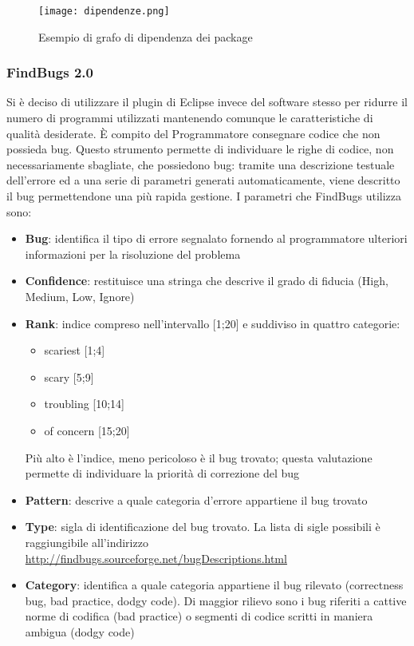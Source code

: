 \documentclass[a4paper,11pt]{article}
\begin{document}
\newpage
\begin{figure}[h!]
\begin{center}
\texttt{[image: dipendenze.png]}
\end{center}
\caption{Esempio di grafo di dipendenza dei package}
\end{figure}


\subsubsection{FindBugs 2.0} 
Si \`e deciso di utilizzare il plugin di Eclipse invece del software stesso per ridurre il numero di programmi utilizzati mantenendo comunque le caratteristiche di qualit\`a desiderate. \`E compito del Programmatore consegnare codice che non possieda bug. Questo strumento permette di individuare le righe di codice, non necessariamente sbagliate, che possiedono bug: tramite una descrizione testuale dell'errore ed a una serie di parametri generati automaticamente, viene descritto il bug permettendone una pi\`u rapida gestione. I parametri che FindBugs utilizza sono:
\begin{itemize}
\item \textbf{Bug}: identifica il tipo di errore segnalato fornendo al programmatore ulteriori informazioni per la risoluzione del problema
\item \textbf{Confidence}: restituisce una stringa che descrive il grado di fiducia (High, Medium, Low, Ignore)
\item \textbf{Rank}: indice compreso nell'intervallo [1;20] e suddiviso in quattro categorie: 
\begin{itemize}
\item scariest [1;4]
\item scary [5;9]
\item troubling [10;14] 
\item of concern [15;20]
\end{itemize} 
Pi\`u alto \`e l'indice, meno pericoloso \`e il bug trovato; questa valutazione permette di individuare la priorit\`a di correzione del bug
\item \textbf{Pattern}: descrive a quale categoria d'errore appartiene il bug trovato
\item \textbf{Type}: sigla di identificazione del bug trovato. La lista di sigle possibili \`e raggiungibile all'indirizzo \url{http://findbugs.sourceforge.net/bugDescriptions.html}
\item \textbf{Category}: identifica a quale categoria appartiene il bug rilevato (correctness bug, bad practice, dodgy code). Di maggior rilievo sono i bug riferiti a 
cattive norme di codifica (bad practice) o segmenti di codice scritti in maniera ambigua (dodgy code)
\end{itemize}
\end{document}
